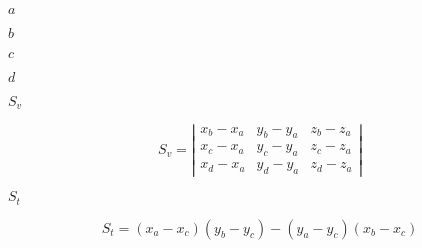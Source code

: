 \documentclass{article}
\begin{document}
$a$
\pagebreak

$b$
\pagebreak

$c$
\pagebreak

$d$
\pagebreak

$S_v$
\pagebreak

\[ S_v = \left| \begin{array}{ccc} x_b - x_a & y_b - y_a & z_b - z_a \\ x_c - x_a & y_c - y_a & z_c - z_a \\ x_d - x_a & y_d - y_a & z_d - z_a \end{array} \right| \]
\pagebreak

$S_t$
\pagebreak

\[ S_t = (x_a - x_c) (y_b - y_c) - (y_a - y_c) (x_b - x_c) \]
\pagebreak
\end{document}
